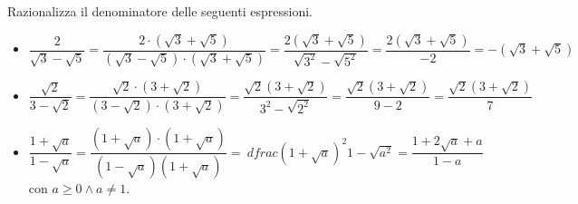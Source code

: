 \begin{exrig}
 \begin{esempio}
Razionalizza il denominatore delle seguenti espressioni.
\begin{itemize}
 \item \(\dfrac 2{\sqrt 3-\sqrt 5}=
 \dfrac{2\cdot (\sqrt 3+\sqrt 5)}{(\sqrt 3-\sqrt 5)\cdot (\sqrt 3+\sqrt 5)}=
 \dfrac{2(\sqrt 3+\sqrt 5)}{\sqrt{3^2}-\sqrt{5^2}}=
 \dfrac{2(\sqrt 3+\sqrt 5)}{-2}=-(\sqrt 3+\sqrt 5)\)
 \item \(\dfrac{\sqrt 2}{3-\sqrt 2}=
 \dfrac{\sqrt 2\cdot (3+\sqrt 2)}{(3-\sqrt 2)\cdot (3+\sqrt 2)}=
 \dfrac{\sqrt 2(3+\sqrt 2)}{3^2-\sqrt{2^2}}=\dfrac{\sqrt 2(3+\sqrt 2)}{9-2}=
 \dfrac{\sqrt 2(3+\sqrt 2)} 7\)
 \item \(\dfrac{1+\sqrt a}{1-\sqrt a}=
 \dfrac{(1+\sqrt a)\cdot (1+\sqrt a)}{(1-\sqrt a)(1+\sqrt a)}=\
 dfrac{(1+\sqrt a)^2}{1-\sqrt{a^2}}=\dfrac{1+2\sqrt a+a}{1-a}\) 
 con \(a\ge 0\wedge a\neq 1\).
\end{itemize}
 \end{esempio}
\end{exrig}

